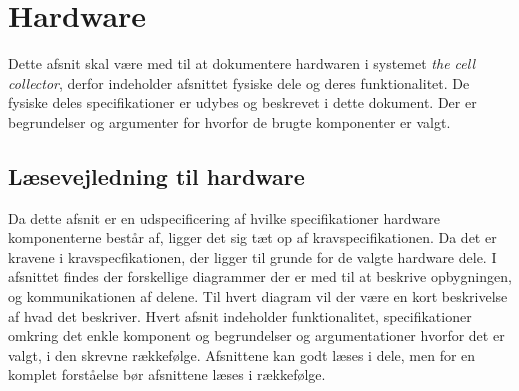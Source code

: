  \section{Hardware}
Dette afsnit skal være med til at dokumentere hardwaren i systemet \textit{the cell collector}, derfor indeholder afsnittet fysiske dele og deres funktionalitet. De fysiske deles specifikationer er udybes og beskrevet i dette dokument. Der er begrundelser og argumenter for hvorfor de brugte komponenter er valgt.

\subsection{Læsevejledning til hardware}
Da dette afsnit er en udspecificering af hvilke specifikationer hardware komponenterne består af, ligger det sig tæt op af kravspecifikationen. Da det er kravene i kravspecfikationen, der ligger til grunde for de valgte hardware dele. I afsnittet findes der forskellige diagrammer der er med til at beskrive opbygningen, og kommunikationen af delene. Til hvert diagram vil der være en kort beskrivelse af hvad det beskriver. Hvert afsnit indeholder funktionalitet, specifikationer omkring det enkle komponent og begrundelser og argumentationer hvorfor det er valgt, i den skrevne rækkefølge. Afsnittene kan godt læses i dele, men for en komplet forståelse bør afsnittene læses i rækkefølge. 

